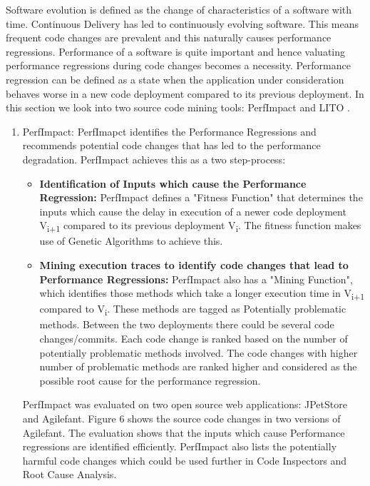 \documentclass[article,type=msc,colorback,12pt,accentcolor=tud7b]{tudthesis}
\begin{document}
	 Software evolution is defined as the change of characteristics of a software with time. Continuous Delivery has led to continuously evolving software. This means frequent code changes are prevalent and this naturally causes performance regressions. Performance of a software is quite important and hence valuating performance regressions during code changes becomes a necessity. Performance regression can be defined as a state when the application under consideration behaves worse in a new code deployment compared to its previous deployment. In this section we look into two source code mining tools: PerfImpact \cite{luomining} and LITO \cite{sandoval2016learning}.
	 \begin{enumerate}
	 \item{PerfImpact:} 
	 PerfImapct identifies the Performance Regressions and recommends potential code changes that has led to the performance degradation. PerfImpact achieves this as a two step-process: 
	 
	 \begin{itemize}
\item{\textbf{Identification of Inputs which cause the Performance Regression:}} 
\newline
PerfImpact defines a "Fitness Function" that determines the inputs which cause the delay in execution of a newer code deployment V\textsubscript{i+1} compared to its previous deployment V\textsubscript{i}. The fitness function makes use of Genetic Algorithms to achieve this. 
 
\item {\textbf{Mining execution traces to identify code changes that lead to Performance Regressions:}} 
\newline
PerfImpact also has a "Mining Function", which identifies those methods which take a longer execution time in V\textsubscript{i+1} compared to V\textsubscript{i}. These methods are tagged as Potentially problematic methods. Between the two deployments there could be several code changes/commits. Each code change is ranked based on the number of potentially problematic methods involved. The code changes with higher number of problematic methods are ranked higher and considered as the possible root cause for the performance regression. 	 
	 
	 \end{itemize}
	
PerfImpact was evaluated on two open source web applications: JPetStore\cite{Jpetstore} and Agilefant\cite{Agilefant}. Figure 6 shows the source code changes in two versions of Agilefant. The evaluation shows that the inputs which cause Performance regressions are identified efficiently. PerfImpact also lists the potentially harmful code changes which could be used further in Code Inspectors and Root Cause Analysis.


\end{enumerate}
\end{document}
